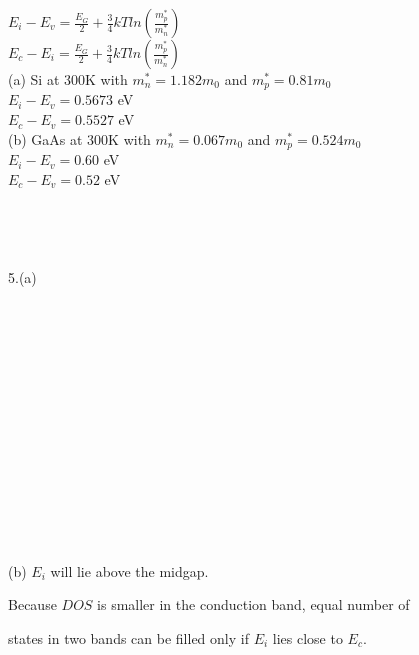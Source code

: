 \documentclass[11pt,oneside,a4paper]{article}
\begin{document}
\hspace{8.5mm} \(E_i-E_v=\frac{E_G}{2}+\frac{3}{4}kTln\left(\frac{m_p^*}{m_n^*}\right)\) \\

\hspace{8.5mm} \(E_c-E_i=\frac{E_G}{2}+\frac{3}{4}kTln\left(\frac{m_p^*}{m_n^*}\right)\) \\

\quad (a) Si at 300K with \(m_n^*=1.182m_0\) and \(m_p^*=0.81m_0\) \\

\hspace{8.5mm} \(E_i-E_v=0.5673\) eV \\

\hspace{8.5mm} \(E_c-E_v=0.5527\) eV \\

\quad (b) GaAs at 300K with \(m_n^*=0.067m_0\) and \(m_p^*=0.524m_0\) \\

\hspace{8.5mm} \(E_i-E_v=0.60\) eV \\

\hspace{8.5mm} \(E_c-E_v=0.52\) eV \\ 
\\
\\
\\
\\

5.\:(a) \\
\\
\\
\\
\\
\\
\\
\\
\\
\\
\\
\\
\\
\\
\\

\quad (b) \(E_i\) will lie above the midgap.

\hspace{8.5mm} Because \(DOS\) is smaller in the conduction band, equal number of 

\hspace{8.5mm} states in two bands can be filled only if \(E_i\) lies close to \(E_c\). \\
\end{document}

